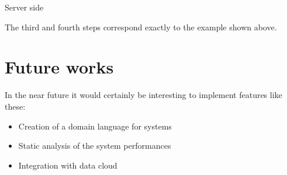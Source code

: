 \documentclass[a4paper,10pt,english,openany,oneside]{sphinxmanual}
\begin{document}
\begin{description}
\begin{description}
\item[{Server side}] \leavevmode
\begin{sphinxVerbatim}[commandchars=\\\{\}]
 \PYG{p}{[}\PYG{p}{]} 
    \PYG{p}{[}\PYG{p}{]}  
\end{sphinxVerbatim}

\end{description}

\end{description}

The third and fourth steps correspond exactly to the example shown above.


\chapter{Future works}
\label{\detokenize{future:future-works}}\label{\detokenize{future::doc}}
In the near future it would certainly be interesting to implement
features like these:
\begin{itemize}
\item {} 
Creation of a domain language for  systems

\item {} 
Static analysis of the system performances

\item {} 
Integration with data cloud

\end{itemize}



\renewcommand{\indexname}{Index}
\printindex
\end{document}
